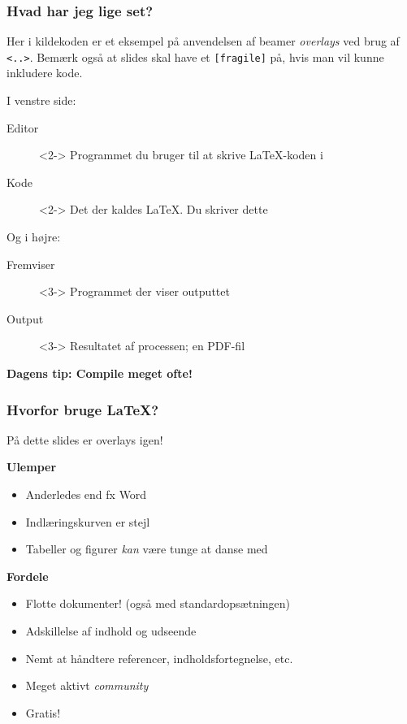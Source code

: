 \documentclass[handout]{beamer}
\newcommand{\tipslide}[2]{%
  \begin{frame}
    \begin{center}
      {\Large\bfseries {#1}: \alert{#2}}
    \end{center}
  \end{frame}
}
\newcommand{\plainbreak}[1]{\vspace{#1\baselineskip}}
\begin{document}
\begin{frame}[fragile]
  \frametitle{Hvad har jeg lige set?}

  Her i kildekoden er et eksempel på anvendelsen af beamer \emph{overlays} ved
  brug af \verb|<..>|. Bemærk også at slides skal have et \verb|[fragile]| på,
  hvis man vil kunne inkludere kode.

  I venstre side:

  \begin{description}
  \item[Editor]<2-> Programmet du bruger til at skrive \LaTeX{}-koden i
  \item[\alert{Kode}]<2-> Det der kaldes \LaTeX{}. Du skriver dette
  \end{description}

  \plainbreak1

  Og i højre:
  \begin{description}
  \item[Fremviser]<3-> Programmet der viser outputtet
  \item[\alert{Output}]<3-> Resultatet af processen; en PDF-fil
  \end{description}
\end{frame}


\tipslide{Dagens tip}{Compile meget ofte!}


\begin{frame}
  \frametitle{Hvorfor bruge \LaTeX{}?}

  På dette slides er overlays igen!

  \textbf{Ulemper}
  \begin{itemize}
  \item<2-> Anderledes end fx Word
  \item<2-> \alert{Indlæringskurven} er stejl
  \item<2-> Tabeller og figurer \textsl{kan} være tunge at danse med
  \end{itemize}


  \medskip

  \textbf{Fordele}
  \begin{itemize}
  \item<3-> Flotte dokumenter! (også med standardopsætningen)
  \item<3-> Adskillelse af \alert{indhold og udseende}
  \item<3-> \alert{Nemt} at håndtere referencer, indholdsfortegnelse, etc.
  \item<3-> Meget aktivt \textsl{community}
  \item<3-> Gratis!
  \end{itemize}
\end{frame}
\end{document}
